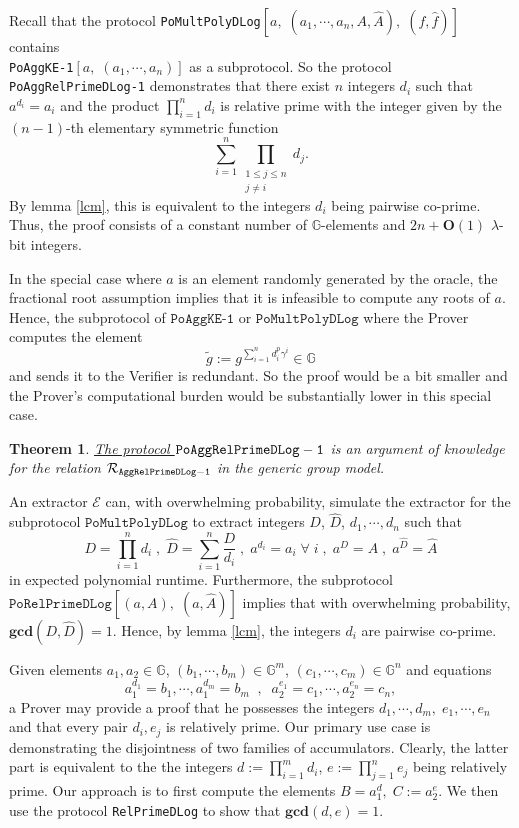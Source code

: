\documentclass[11pt, lettersize, notitlepage, leqno, footskip=0.6cm]{article}
\newcommand{\pl}{\prod\limits}
\newcommand{\slim}{\sum\limits}
\newcommand{\ttt}{\texttt}
\newcommand{\bG}{\mathbb{G}}
\newcommand{\wti}{\widetilde}
\newcommand{\mc}{\mathcal}
\newcommand{\mb}{\mathbb}
\newcommand{\mbf}{\mathbf}
\newcommand{\lam}{\lambda}
\newcommand{\what}{\widehat}
\newcommand{\bO}{\mbf{O}}
\newcommand{\vs}{\vspace{-0.15cm}}
\newcommand{\noin}{\noindent}
\newcommand{\op}{overwhelming probability}
\newcommand{\GCD}{\mbf{gcd}}
\newcommand{\E}{\mc{E}}
\newtheorem{Thm}{Theorem}[section]
\numberwithin{equation}{section}
\begin{document}
Recall that the protocol \verb|PoMultPolyDLog|$[a,\;(a_1,\cdots,a_n,A, \what{A}),\; (f,\what{f})]$  contains\\ \verb|PoAggKE-1|$[a,\;(a_1,\cdots,a_n)]$ as a subprotocol. So the protocol \verb|PoAggRelPrimeDLog-1| demonstrates that there exist $n$ integers $d_i$ such that $a^{d_i} = a_i$ and the product $\prod_{i=1}^n d_i$ is relative prime with the integer given by the $(n-1)$-th elementary symmetric function \vs $$\slim_{i=1}^n \pl_{\substack{1\leq j\leq n \\ j\neq i}} d_j. $$ By lemma \ref{lcm}, this is equivalent to the integers $d_i$ being pairwise co-prime. Thus, the proof consists of a constant number of $\mb{G}$-elements and $2n+\bO(1)$ $\lam$-bit integers. 

In the special case where $a$ is an element randomly generated by the oracle, the fractional root assumption implies that it is infeasible to compute any roots of $a$. Hence, the subprotocol of $\ttt{PoAggKE-1}$ or $\ttt{PoMultPolyDLog}$ where the Prover computes the element \vs $$\wti{g}:= g^{\slim_{i=1}^n d_i^{p}\gamma^i}\in \bG$$ and sends it to the Verifier is redundant. So the proof would be a bit smaller and the Prover's computational burden would be substantially lower in this special case. \vspace{0.2cm}

\begin{Thm} \hyperlink{RP1}{The protocol $\tt{PoAggRelPrimeDLog}-1$} is an argument of knowledge for the relation $\mc{R}_{\tt{AggRelPrimeDLog-1}}$ in the generic group model.\end{Thm}

\begin{prf} An extractor $\E$ can, with \op, simulate the extractor for the\\ subprotocol $\ttt{PoMultPolyDLog}$ to extract integers $D$, $\what{D}$, $d_1,\cdots,d_n$ such that \vs $$D = \pl_{i=1}^n d_i\;,\;\what{D} = \slim_{i=1}^n \frac{D}{d_i}   \;,\;a^{d_i} = a_i\;\forall\;i \;,\;a^{D} = A\;,\; a^{\what{D}} = \what{A} $$ in expected polynomial runtime. Furthermore, the subprotocol $\ttt{PoRelPrimeDLog}[(a,A),\;(a,\what{A})]$ implies that with \op, $\GCD(D,\what{D}) = 1$. Hence, by lemma \ref{lcm}, the integers $d_i$ are pairwise co-prime.\end{prf}



\bigskip

\noin Given elements $a_1, a_2\in \mb{G}$, $(b_1,\cdots,b_m)\in\bG^m$, $(c_1,\cdots,c_m)\in\bG^n$ and equations $$a_1^{d_1} = b_1,\cdots, a_1^{d_m}= b_m\;\;,\;\; a_2^{e_1} = c_1,\cdots, a_2^{e_n} = c_n,$$ a Prover may provide a proof that he possesses the integers $d_1,\cdots, d_m,\;e_1,\cdots, e_n$ and that every pair $d_i, e_j$ is relatively prime. Our primary use case is demonstrating the disjointness of two families of accumulators. Clearly, the latter part is equivalent to the the integers $d:=\prod_{i=1}^m d_i$, $e:=\prod_{j=1}^n e_j$ being relatively prime. Our approach is to first compute the elements $B = a_1^d,\;C:= a_2^{e}$. We then  use the protocol \verb|RelPrimeDLog| to show that $\GCD(d, e) = 1$. 
\end{document}
